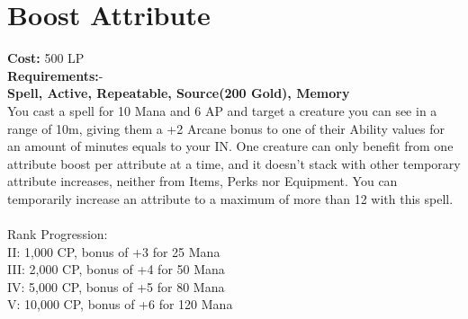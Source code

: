 \section{Boost Attribute}\label{spell:boostAttribute}
\textbf{Cost:} 500 LP\\
\textbf{Requirements:}-\\
\textbf{Spell, Active, Repeatable, Source(200 Gold), Memory}\\
You cast a spell for 10 Mana and 6 AP and target a creature you can see in a range of 10m, giving them a +2 Arcane bonus to one of their Ability values for an amount of minutes equals to your IN.
One creature can only benefit from one attribute boost per attribute at a time, and it doesn't stack with other temporary attribute increases, neither from Items, Perks nor Equipment.
You can temporarily increase an attribute to a maximum of more than 12 with this spell.\\
\\
Rank Progression:\\
II: 1,000 CP, bonus of +3 for 25 Mana\\
III: 2,000 CP, bonus of +4 for 50 Mana\\
IV: 5,000 CP, bonus of +5 for 80 Mana\\
V: 10,000 CP, bonus of +6 for 120 Mana\\